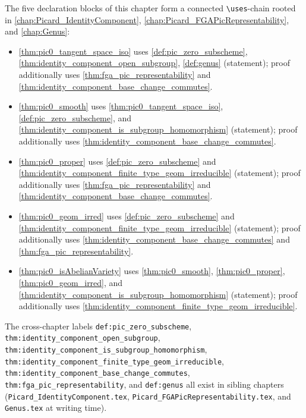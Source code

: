 The five declaration blocks of this chapter form a connected
\texttt{\textbackslash uses}-chain rooted in
\cref{chap:Picard_IdentityComponent},
\cref{chap:Picard_FGAPicRepresentability}, and \cref{chap:Genus}:

\begin{itemize}
  \item \cref{thm:pic0_tangent_space_iso} uses
    \cref{def:pic_zero_subscheme},
    \cref{thm:identity_component_open_subgroup},
    \cref{def:genus} (statement); proof additionally uses
    \cref{thm:fga_pic_representability} and
    \cref{thm:identity_component_base_change_commutes}.
  \item \cref{thm:pic0_smooth} uses
    \cref{thm:pic0_tangent_space_iso},
    \cref{def:pic_zero_subscheme}, and
    \cref{thm:identity_component_is_subgroup_homomorphism} (statement);
    proof additionally uses
    \cref{thm:identity_component_base_change_commutes}.
  \item \cref{thm:pic0_proper} uses
    \cref{def:pic_zero_subscheme} and
    \cref{thm:identity_component_finite_type_geom_irreducible}
    (statement); proof additionally uses
    \cref{thm:fga_pic_representability} and
    \cref{thm:identity_component_base_change_commutes}.
  \item \cref{thm:pic0_geom_irred} uses
    \cref{def:pic_zero_subscheme} and
    \cref{thm:identity_component_finite_type_geom_irreducible}
    (statement); proof additionally uses
    \cref{thm:identity_component_base_change_commutes} and
    \cref{thm:fga_pic_representability}.
  \item \cref{thm:pic0_isAbelianVariety} uses
    \cref{thm:pic0_smooth},
    \cref{thm:pic0_proper},
    \cref{thm:pic0_geom_irred}, and
    \cref{thm:identity_component_is_subgroup_homomorphism}
    (statement); proof additionally uses
    \cref{thm:identity_component_finite_type_geom_irreducible}.
\end{itemize}

The cross-chapter labels
\texttt{def:pic\_zero\_subscheme},
\texttt{thm:identity\_component\_open\_subgroup},
\texttt{thm:identity\_component\_is\_subgroup\_homomorphism},
\texttt{thm:identity\_component\_finite\_type\_geom\_irreducible},
\texttt{thm:identity\_component\_base\_change\_commutes},
\texttt{thm:fga\_pic\_representability}, and
\texttt{def:genus} all exist in sibling chapters
(\texttt{Picard\_IdentityComponent.tex},
\texttt{Picard\_FGAPicRepresentability.tex}, and \texttt{Genus.tex} at
writing time).
